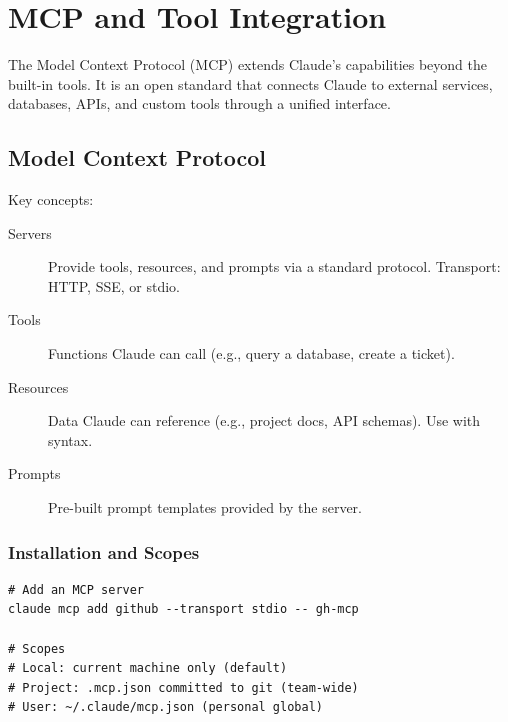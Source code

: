 \chapter{MCP and Tool Integration}
\label{ch:mcp}

The Model Context Protocol (MCP) extends Claude's capabilities beyond
the built-in tools. It is an open standard that connects Claude to
external services, databases, APIs, and custom tools through a
unified interface.

\section{Model Context Protocol}
\label{sec:mcp-overview}


 Key concepts:

\begin{description}
  \item[Servers] Provide tools, resources, and prompts via a standard protocol.
    Transport: HTTP, SSE, or stdio.
  \item[Tools] Functions Claude can call (e.g., query a database, create a ticket).
  \item[Resources] Data Claude can reference (e.g., project docs, API schemas).
    Use with  syntax.
  \item[Prompts] Pre-built prompt templates provided by the server.
\end{description}

\subsection{Installation and Scopes}

\begin{verbatim}
# Add an MCP server
claude mcp add github --transport stdio -- gh-mcp

# Scopes
# Local: current machine only (default)
# Project: .mcp.json committed to git (team-wide)
# User: ~/.claude/mcp.json (personal global)
\end{verbatim}


